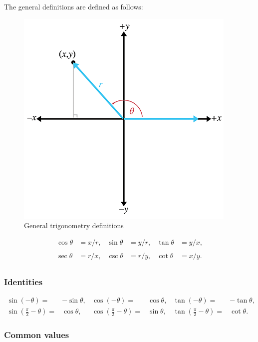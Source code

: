 \documentclass[11pt]{article}
\begin{document}
The general definitions are defined as follows:
\begin{figure}[H]
\centering
    \includegraphics{01_general_trigonometry_definitions}
\caption{General trigonometry definitions}
\label{fig:general-trigonometry-definitions}
\end{figure}

\[\begin{matrix}
{\cos\theta} & {= x/r,} & {\sin\theta} & {= y/r,} & {\tan\theta} & {= y/x,} \\
 & & & & & \\
{\sec\theta} & {= r/x,} & {\csc\theta} & {= r/y,} & {\cot\theta} & {= x/y.} \\
\end{matrix}\]

\subsubsection{Identities}

\[
\begin{array}{rlrlrl}
{\sin( - \theta) =} & {- \sin\theta,} & {\cos( - \theta) =} & {\cos\theta,} & {\tan( - \theta) =} & {- \tan\theta,} \\
{\sin\left( \frac{\pi}{2} - \theta \right) =} & {\cos\theta,} & {\cos\left( \frac{\pi}{2} - \theta \right) =} & {\sin\theta,} & {\tan\left( \frac{\pi}{2} - \theta \right) =} & {\cot\theta.}
\end{array}
\]

\subsubsection{Common values}
\end{document}
